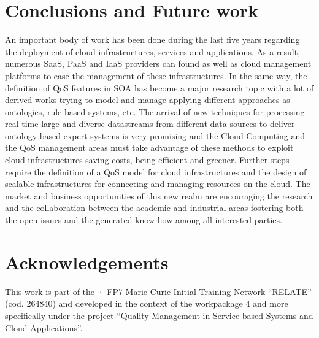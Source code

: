 \documentclass[preprint,12pt]{elsarticle}
\begin{document}
\section{Conclusions and Future work}\label{sect:conclusions}
An important body of work has been done during the last five years regarding the
deployment of cloud infrastructures, services and applications. As a result,
numerous SaaS, PaaS and IaaS providers can found as well as cloud management
platforms to ease the management of these infrastructures. In the same way, the
definition of QoS features in SOA has become a major research topic with a lot
of derived works trying to model and manage applying different approaches as
ontologies, rule based systems, etc. The arrival of new techniques for
processing real-time large and diverse datastreams from different data sources
to deliver ontology-based expert systems is very promising and the Cloud
Computing and the QoS management areas must take advantage of these methods to exploit cloud
infrastructures saving costs, being efficient and greener. Further steps require
the definition of a QoS model for cloud infrastructures and the design of
scalable infrastructures for connecting and managing resources on the cloud. The
market and business opportunities of this new realm are encouraging the research and the
collaboration between the academic and industrial areas fostering both the open
issues and the generated know-how among all interested parties.

\section{Acknowledgements}\label{sect:ack}
This work is part of the · FP7 Marie Curie Initial Training Network ``RELATE'' (cod. 264840) and developed in the context of the workpackage 4 and more 
specifically under the project ``Quality Management in Service-based Systems and Cloud Applications''.



% 


\end{document}
